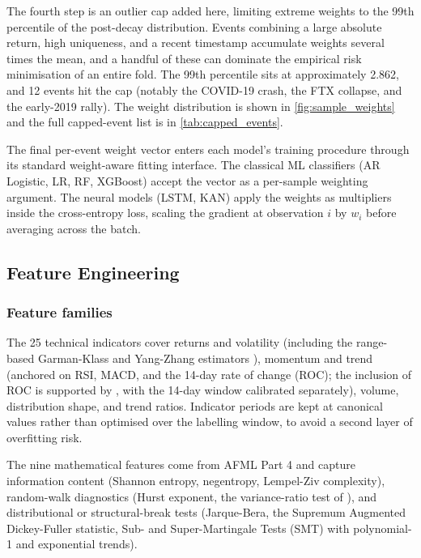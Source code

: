 The fourth step is an outlier cap added here, limiting extreme weights to the 99th percentile of the post-decay distribution. Events combining a large absolute return, high uniqueness, and a recent timestamp accumulate weights several times the mean, and a handful of these can dominate the empirical risk minimisation of an entire fold. The 99th percentile sits at approximately 2.862, and 12 events hit the cap (notably the COVID-19 crash, the FTX collapse, and the early-2019 rally). The weight distribution is shown in \label{ref:weights_call}\autoref{fig:sample_weights} and the full capped-event list is in \autoref{tab:capped_events}.

The final per-event weight vector enters each model's training procedure through its standard weight-aware fitting interface. The classical ML classifiers (AR Logistic, LR, RF, XGBoost) accept the vector as a per-sample weighting argument. The neural models (LSTM, KAN) apply the weights as multipliers inside the cross-entropy loss, scaling the gradient at observation $i$ by $w_i$ before averaging across the batch.


\subsection{Feature Engineering}\label{subsec:features}


\subsubsection{Feature families}\label{subsubsec:feature_families}

The 25 technical indicators cover returns and volatility (including the range-based Garman-Klass and Yang-Zhang estimators \citep{garman_klass_1980, yang_zhang_2000}), momentum and trend (anchored on RSI, MACD, and the 14-day rate of change (ROC); the inclusion of ROC is supported by \citet{mate_confluence_2024}, with the 14-day window calibrated separately), volume, distribution shape, and trend ratios. Indicator periods are kept at canonical values rather than optimised over the labelling window, to avoid a second layer of overfitting risk.

The nine mathematical features come from AFML Part 4 \citep{lopez_de_prado_2018} and capture information content (Shannon entropy, negentropy, Lempel-Ziv complexity), random-walk diagnostics (Hurst exponent, the variance-ratio test of \citet{lo_mackinlay_1988}), and distributional or structural-break tests (Jarque-Bera, the Supremum Augmented Dickey-Fuller statistic, Sub- and Super-Martingale Tests (SMT) with polynomial-1 and exponential trends).

